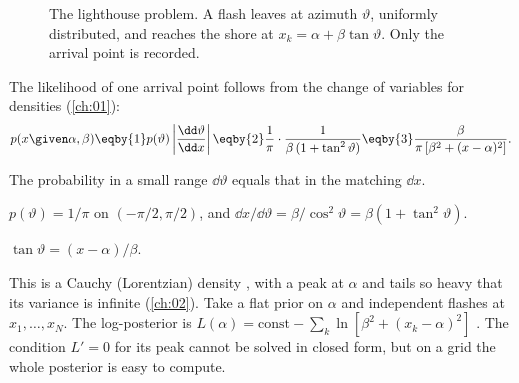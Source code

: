 \begin{figure}[htbp]
\centering
{}
\caption{The lighthouse problem. A flash leaves at azimuth $\vartheta$, uniformly
distributed, and reaches the shore at $x_k=\alpha+\beta\tan\vartheta$. Only the arrival
point is recorded.}
\label{5b:fig:lighthouse-geom}
\end{figure}

The likelihood of one arrival point follows from the change of variables for densities
(\cref{ch:01}):
\begin{align*}
  p(x\given\alpha,\beta)
  \eqby{1}p(\vartheta)\left|\frac{\dd\vartheta}{\dd x}\right|
  \eqby{2}\frac1\pi\cdot\frac{1}{\beta\,(1+\tan^2\vartheta)}
  \eqby{3}\frac{\beta}{\pi\,[\beta^2+(x-\alpha)^2]} .
\end{align*}
\begin{explain}
  \item The probability in a small range $\dd\vartheta$ equals that in the matching
        $\dd x$.
  \item $p(\vartheta)=1/\pi$ on $(-\pi/2,\pi/2)$, and $\dd x/\dd\vartheta=\beta/\cos^2
        \vartheta=\beta(1+\tan^2\vartheta)$.
  \item $\tan\vartheta=(x-\alpha)/\beta$.
\end{explain}
This is a Cauchy (Lorentzian) density , with a peak at $\alpha$ and
tails so heavy that its variance is infinite (\cref{ch:02}). Take a flat prior on
$\alpha$ and independent flashes at $x_1,\dots,x_N$. The log-posterior is
$L(\alpha)=\text{const}-\sum_k\ln[\beta^2+(x_k-\alpha)^2]$ . The
condition $L'=0$ for its peak cannot be solved in closed form, but on a grid the whole
posterior is easy to compute.

